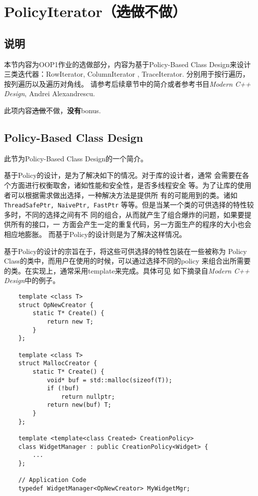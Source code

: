\documentclass[12pt, a4paper]{article}
\newcommand{\ilc}{\texttt}
\begin{document}
\newpage
\section{PolicyIterator（\sout{选做}不做）}

\subsection{说明}
  本节内容为OOP1作业的选做部分，内容为基于Policy-Based
  Class Design来设计三类迭代器：RowIterator, ColumnIterator
  , TraceIterator. 分别用于按行遍历，按列遍历以及遍历对角线。
  请参考后续章节中的简介或者参考书目\textit{Modern C++ Design},
  Andrei Alexandrescu.
  \par 此项内容\sout{选做}不做，\textbf{没有}bonus.

\subsection{Policy-Based Class Design}
  此节为Policy-Based Class Design的一个简介。\par
  基于Policy的设计，是为了解决如下的情况。对于库的设计者，通常
  会需要在各个方面进行权衡取舍，诸如性能和安全性，是否多线程安全
  等。为了让库的使用者可以根据需求做出选择，一种解决方法是提供所
  有的可能用到的类。诸如\ilc{ThreadSafePtr, NaivePtr, FastPtr}
  等等。但是当某一个类的可供选择的特性较多时，不同的选择之间有不
  同的组合，从而就产生了组合爆炸的问题，如果要提供所有的接口，一
  方面会产生一定的重复代码，另一方面生产的程序的大小也会相应地膨胀。
  而基于Policy的设计则是为了解决这样情况。\par
  基于Policy的设计的宗旨在于，将这些可供选择的特性包装在一些被称为
  Policy Class的类中，而用户在使用的时候，可以通过选择不同的policy
  来组合出所需要的类。在实现上，通常采用template来完成。具体可见
  如下摘录自\textit{Modern C++ Design}中的例子。
  \begin{lstlisting}
    template <class T>
    struct OpNewCreator {
        static T* Create() {
            return new T;
        }
    };

    template <class T>
    struct MallocCreator {
        static T* Create() {
            void* buf = std::malloc(sizeof(T));
            if (!buf)
                return nullptr;
            return new(buf) T;
        }
    };

    template <template<class Created> CreationPolicy>
    class WidgetManager : public CreationPolicy<Widget> {
        ...
    };

    // Application Code
    typedef WidgetManager<OpNewCreator> MyWidgetMgr;

  \end{lstlisting}
\end{document}
